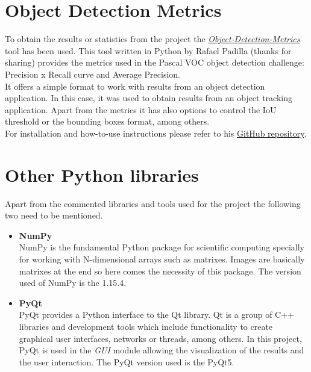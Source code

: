 \section{Object Detection Metrics}
To obtain the results or statistics from the project the \href{https://github.com/rafaelpadilla/Object-Detection-Metrics}{\textit{Object-Detection-Metrics}} tool has been used. This tool written in Python by Rafael Padilla (thanks for sharing) provides the metrics used in the Pascal VOC object detection challenge: Precision x Recall curve and Average Precision.\\
It offers a simple format to work with results from an object detection application. In this case, it was used to obtain results from an object tracking application. Apart from the metrics it has also options to control the IoU threshold or the bounding boxes format, among others.\\
For installation and how-to-use instructions please refer to his \href{https://github.com/rafaelpadilla/Object-Detection-Metrics}{GitHub repository}.
\section{Other Python libraries}
Apart from the commented libraries and tools used for the project the following two need to be mentioned.
\begin{itemize}
\item \textbf{NumPy}\\
NumPy is the fundamental Python package for scientific computing specially for working with N-dimensional arrays such as matrixes. Images are basically matrixes at the end so here comes the necessity of this package. The version used of NumPy is the 1.15.4.
\item \textbf{PyQt}\\
PyQt provides a Python interface to the Qt library. Qt is a group of C++ libraries and development tools which include functionality to create graphical user interfaces, networks or threads, among others. In this project, PyQt is used in the \textit{GUI} module allowing the visualization of the results and the user interaction. The PyQt version used is the PyQt5.
\end{itemize}
